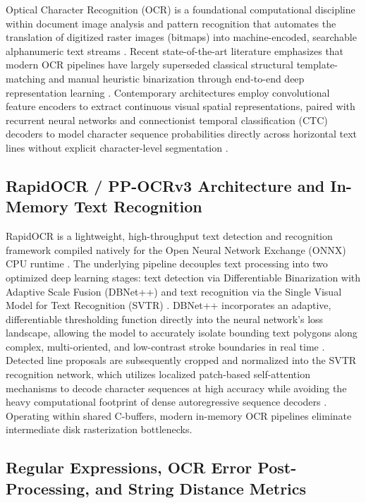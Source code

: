 Optical Character Recognition (OCR) is a foundational computational discipline within document image analysis and pattern recognition that automates the translation of digitized raster images (bitmaps) into machine-encoded, searchable alphanumeric text streams \cite{ref20}.
Recent state-of-the-art literature emphasizes that modern OCR pipelines have largely superseded classical structural template-matching and manual heuristic binarization through end-to-end deep representation learning \cite{ref21}.
Contemporary architectures employ convolutional feature encoders to extract continuous visual spatial representations, paired with recurrent neural networks and connectionist temporal classification (CTC) decoders to model character sequence probabilities directly across horizontal text lines without explicit character-level segmentation \cite{ref20, ref21}.

\subsection{RapidOCR / PP-OCRv3 Architecture and In-Memory Text Recognition}

RapidOCR is a lightweight, high-throughput text detection and recognition framework compiled natively for the Open Neural Network Exchange (ONNX) CPU runtime \cite{ref22}.
The underlying pipeline decouples text processing into two optimized deep learning stages: text detection via Differentiable Binarization with Adaptive Scale Fusion (DBNet++) \cite{ref23} and text recognition via the Single Visual Model for Text Recognition (SVTR) \cite{ref24}.
DBNet++ incorporates an adaptive, differentiable thresholding function directly into the neural network’s loss landscape, allowing the model to accurately isolate bounding text polygons along complex, multi-oriented, and low-contrast stroke boundaries in real time \cite{ref23}.
Detected line proposals are subsequently cropped and normalized into the SVTR recognition network, which utilizes localized patch-based self-attention mechanisms to decode character sequences at high accuracy while avoiding the heavy computational footprint of dense autoregressive sequence decoders \cite{ref24}.
Operating within shared C-buffers, modern in-memory OCR pipelines eliminate intermediate disk rasterization bottlenecks.

\subsection{Regular Expressions, OCR Error Post-Processing, and String Distance Metrics}
\label{sec:ocr_error_postprocessing}

